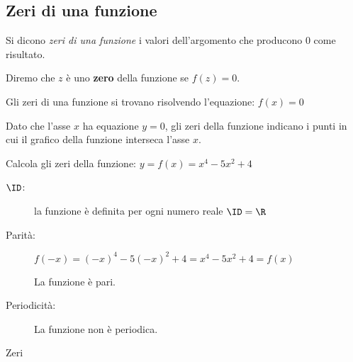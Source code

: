 \subsection{Zeri di una funzione}

Si dicono \emph{zeri di una funzione} i valori dell'argomento che producono 
\(0\) come risultato.

\begin{definizione}
Diremo che \(z\) è uno \textbf{zero} della funzione se \(f(z) = 0\).
\end{definizione}

Gli zeri di una funzione si trovano risolvendo l'equazione: \(f(x) = 0\)

Dato che l'asse \(x\) ha equazione \(y = 0\), gli zeri della funzione 
indicano i punti in cui il grafico della funzione interseca l'asse \(x\).

\begin{esempio}
\label{esempio:funzioni_zeri}
Calcola gli zeri della funzione: \(y = f(x) = x^4 -5x^2 +4\)

\begin{description}
\item [\(\ID\):] la funzione è definita per ogni numero reale \quad 
\(\ID = \R\)
\item [Parità:] 
\(f(-x) = (-x)^4 -5(-x)^2 +4 = x^4 -5x^2 +4 = f(x)\)

La funzione è pari.
\item [Periodicità:] 
La funzione non è periodica.
\item [Zeri]~

\end{description}
\end{esempio}

